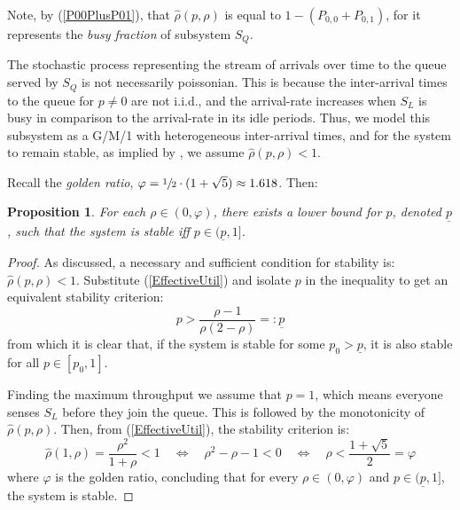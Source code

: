 \documentclass[11pt]{article}
\numberwithin{equation}{section}
\newtheorem{proposition}{Proposition}[section]
\begin{document}
Note, by (\ref{P00PlusP01}), that $\hat{\rho}(p,\rho)$ is equal to $1-(P_{0,0}+P_{0,1})$, for it represents the {\it busy fraction} of subsystem $S_Q$.

The stochastic process representing the stream of arrivals over time to the queue served by $S_Q$ is not necessarily poissonian. This is because the inter-arrival times to the queue for $p \neq 0$ are not i.i.d., and the arrival-rate increases when $S_L$ is busy in comparison to the arrival-rate in its idle periods. Thus, we model this subsystem as a G/M/1 with heterogeneous inter-arrival times, and for the system to remain stable, as implied by \cite{Yehiali&Naor}, we assume $\hat{\rho}(p,\rho) < 1$.

Recall the {\it golden ratio}, $\varphi = \sfrac{1}{2} \cdot (1+\sqrt{5})\approx 1.618$. Then:

\begin{proposition}
For each $\rho\in(0,\varphi)$, there exists a lower bound for $p$, denoted $\underline{p}$, such that the system is stable iff $p \in (\underline{p}, 1]$.
\end{proposition}

\begin{proof}
As discussed, a necessary and sufficient condition for stability is: $\hat{\rho}(p,\rho) < 1$. Substitute (\ref{EffectiveUtil}) and isolate $p$ in the inequality to get an equivalent stability criterion:
\[ p > \frac{\rho - 1}{\rho(2-\rho)} =: \underline{p}\]
from which it is clear that, if the system is stable for some $p_0 > \underline{p}$, it is also stable for all $p \in [p_0,1]$.

Finding the maximum throughput we assume that $p=1$, which means everyone senses $S_L$ before they join the queue. This is followed by the monotonicity of $\hat{\rho}(p,\rho)$. Then, from (\ref{EffectiveUtil}), the stability criterion is:
\[ \hat{\rho}(1,\rho)=\frac{\rho^2}{1+\rho}<1 \quad\Leftrightarrow\quad \rho^2-\rho-1<0 \quad\Leftrightarrow\quad \rho < \frac{1+\sqrt{5}}{2}=\varphi \]
where $\varphi$ is the golden ratio, concluding that for every $\rho\in(0,\varphi)$ and $p \in (\underline{p},1]$, the system is stable.
\end{proof}

\newpage
\end{document}
